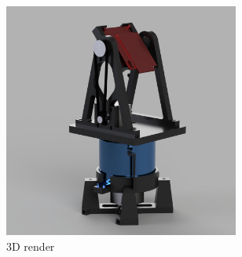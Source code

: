 \begin{figure}[h!]
  \centering
  \begin{subfigure}[b]{0.55\textwidth}
    \centering
    \includegraphics[width=0.85\textwidth]{../img/whole_assembly_2.png}
    \caption{3D render}
  \end{subfigure}
  \hspace{0.05\textwidth} %
  \begin{subfigure}[b]{0.35\textwidth}
    \centering

\end{subfigure}
\end{figure}
